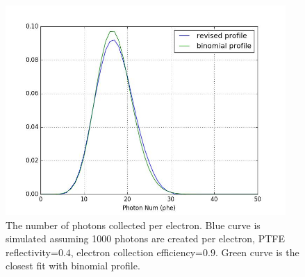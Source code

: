 \begin{figure}[!ht]
  \centering
  \includegraphics[width=0.95\textwidth]
  {Figures/Ch10/SE_profile.jpg}
  \caption{The number of photons collected per electron. Blue curve is simulated assuming 1000 photons are created per electron, PTFE reflectivity=$0.4$, electron collection efficiency=$0.9$. Green curve is the closest fit with binomial profile.}
  \label{fig: single electron size from sim}
\end{figure}

